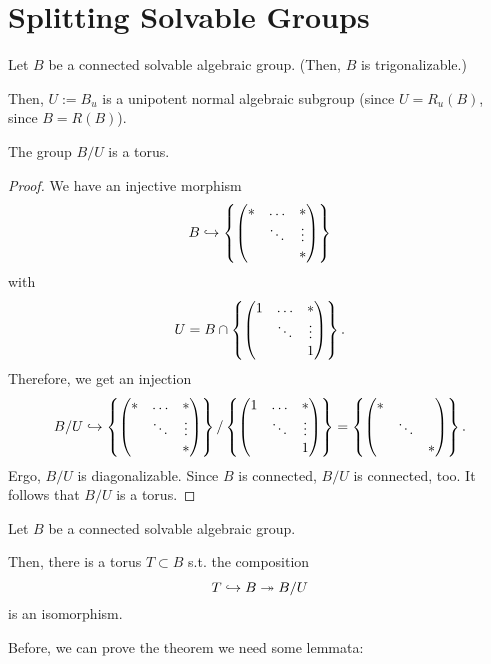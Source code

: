 \section{Splitting Solvable Groups}
Let $B$ be a connected solvable algebraic group. (Then, $B$ is trigonalizable.)

Then, $U := B_u$ is a unipotent normal algebraic subgroup (since $U = R_u(B)$, since $B = R(B)$).

\begin{lemma}
	The group $B / U$ is a torus.
\end{lemma}
\begin{proof}
	We have an injective morphism
	\[ B \overset{}{\hookrightarrow} \left\lbrace\left(\begin{matrix} * & \ldots & * \\  & \ddots & \vdots \\ & & * \end{matrix}\right)\right\rbrace\]
	with
	\[ U = B \cap \left\lbrace\left(\begin{matrix} 1 & \ldots & * \\  & \ddots & \vdots \\ & & 1 \end{matrix}\right)\right\rbrace. \]
	Therefore, we get an injection
	\[B / U \overset{}{\hookrightarrow} \left\lbrace\left(\begin{matrix} * & \ldots & * \\  & \ddots & \vdots \\ & & * \end{matrix}\right)\right\rbrace / \left\lbrace\left(\begin{matrix} 1 & \ldots & * \\  & \ddots & \vdots \\ & & 1 \end{matrix}\right)\right\rbrace = \left\lbrace\left(\begin{matrix} * &  &  \\  & \ddots & \\ & & * \end{matrix}\right)\right\rbrace. \]
	Ergo, $B/U$ is diagonalizable. Since $B$ is connected, $B/U$ is connected, too.
	It follows that $B/U$ is a torus.
\end{proof}

\begin{theorem}
	Let $B$ be a connected solvable algebraic group.
	
	Then, there is a torus $T \subset B$ s.t. the composition
	\[ T \overset{}{\hookrightarrow} B \overset{}{\twoheadrightarrow} B/U \]
	is an isomorphism.
\end{theorem}
Before, we can prove the theorem we need some lemmata:

